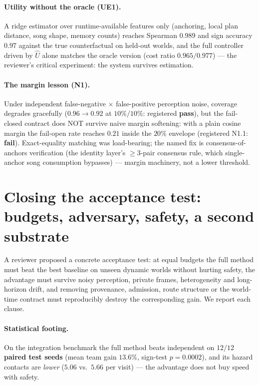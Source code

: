 \documentclass{article}
\begin{document}
\paragraph{Utility without the oracle (UE1).} A ridge estimator over
runtime-available features only (anchoring, local plan distance, song
shape, memory counts) reaches Spearman $0.989$ and sign accuracy
$0.97$ against the true counterfactual on held-out worlds, and the
full controller driven by $\widehat U$ alone matches the oracle
version (cost ratio $0.965/0.977$) --- the reviewer's critical
experiment: the system survives estimation.

\paragraph{The margin lesson (N1).} Under independent false-negative
$\times$ false-positive perception noise, coverage degrades
gracefully ($0.96 \to 0.92$ at $10\%/10\%$: registered
\textbf{pass}), but the fail-closed contract does NOT survive naive
margin softening: with a plain cosine margin the fail-open rate
reaches $0.21$ inside the $20\%$ envelope (registered N1.1:
\textbf{fail}). Exact-equality matching was load-bearing; the named
fix is consensus-of-anchors verification (the identity layer's
$\ge 3$-pair consensus rule, which single-anchor song consumption
bypasses) --- margin machinery, not a lower threshold.


\section{Closing the acceptance test: budgets, adversary, safety, a
second substrate}
\label{p5:sec:acceptance}

A reviewer proposed a concrete acceptance test: at equal budgets the
full method must beat the best baseline on unseen dynamic worlds
without hurting safety, the advantage must survive noisy perception,
private frames, heterogeneity and long-horizon drift, and removing
provenance, admission, route structure or the world-time contract
must reproducibly destroy the corresponding gain. We report each
clause.

\paragraph{Statistical footing.} On the integration benchmark the
full method beats independent on \textbf{$12/12$ paired test seeds}
(mean team gain $13.6\%$, sign-test $p = 0.0002$), and its hazard
contacts are \emph{lower} ($5.06$ vs.\ $5.66$ per visit) --- the
advantage does not buy speed with safety.
\end{document}
